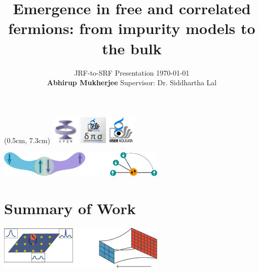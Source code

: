 \documentclass[8pt,aspectratio=169]{beamer}
\title{Emergence in free and correlated fermions: from impurity models to the bulk}
\author{
JRF-to-SRF Presentation \hspace*{0.25\textwidth}\today\\[10pt]
{\bf Abhirup Mukherjee} \hspace*{0.29\textwidth}Supervisor: Dr. Siddhartha Lal}
\institute{\small Department of Physical Sciences, IISER Kolkata, Mohanpur}
\date{}
\begin{document}
\centering

\begin{frame}
\maketitle
\begin{textblock*}{\textwidth}(0.5cm, 7.3cm)
	\centering
	\includegraphics[width=0.1\textwidth]{figures/epqm_logo_mod.jpeg}
	\hspace*{\fill}
	\includegraphics[width=0.1\textwidth]{figures/dps_logo.jpeg}
	\hspace*{\fill}
	\includegraphics[width=0.1\textwidth]{figures/IISER-K_Logo.png}
\end{textblock*}
\end{frame}

\begin{frame}{}
\flushleft
\includegraphics[width=0.6\textwidth]{./figures/summary.pdf}

\vspace*{40pt}

\section{Summary of Work}

\vspace*{30pt}

\flushright
\includegraphics[width=0.6\textwidth]{./figures/summary2.pdf}
\end{frame}
\end{document}
